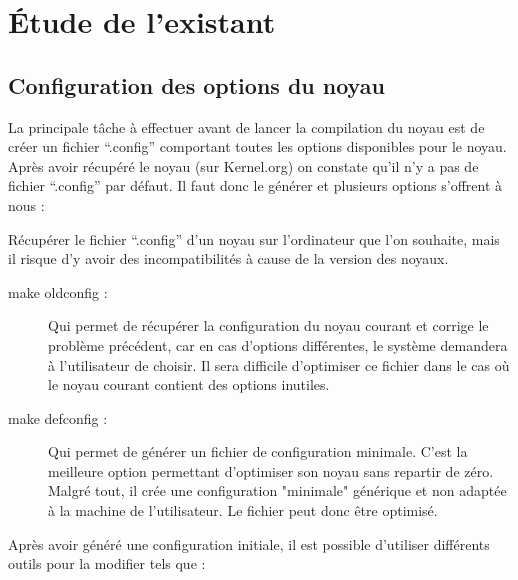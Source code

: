 \documentclass[16pts]{report}
\begin{document}
\chapter{Étude de l'existant}
\label{cha:Étude de l'existant}

\section{Configuration des options du noyau}
\label{sec:Configuration des options du noyau}

La principale tâche à effectuer avant de lancer la compilation du noyau est de
créer un fichier “.config” comportant toutes les options disponibles pour le
noyau.  Après avoir récupéré le noyau (sur Kernel.org) on constate qu’il n’y a
pas de fichier “.config” par défaut. Il faut donc le générer et plusieurs
options s’offrent à nous :

Récupérer le fichier “.config” d’un noyau sur l’ordinateur que l’on souhaite,
mais il risque d’y avoir des incompatibilités à cause de la version des noyaux.

\begin{description}
    \item[make oldconfig :] Qui permet de récupérer la configuration du noyau
        courant et corrige le problème précédent, car en cas d’options
        différentes, le système demandera à l’utilisateur de choisir. Il sera
        difficile d’optimiser ce fichier dans le cas où le noyau courant
        contient des options inutiles.

    \item[make defconfig :] Qui permet de générer un fichier de configuration
        minimale.  C’est la meilleure option permettant d’optimiser son noyau
        sans repartir de zéro.  Malgré tout, il crée une configuration
        "minimale" générique et non adaptée à la machine de l’utilisateur.
        Le fichier peut donc être optimisé.
\end{description}

Après avoir généré une configuration initiale, il est possible d’utiliser
différents outils pour la modifier tels que :
\end{document}
